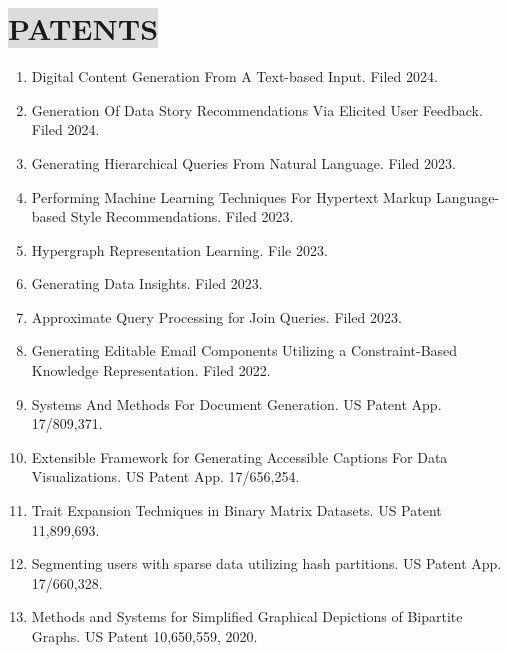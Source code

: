 \section*{
    \colorbox{gainsboro}{PATENTS}  
}

\begin{enumerate}[leftmargin=8mm,nosep]
    \item Digital Content Generation From A Text-based Input. Filed 2024.
    \item Generation Of Data Story Recommendations Via Elicited User Feedback. Filed 2024.
    \item Generating Hierarchical Queries From Natural Language. Filed 2023.
    \item Performing Machine Learning Techniques For Hypertext Markup Language-based Style Recommendations. Filed 2023.
    \item Hypergraph Representation Learning. File 2023.
    \item Generating Data Insights. Filed 2023.
    \item Approximate Query Processing for Join Queries. Filed 2023.
    \item Generating Editable Email Components Utilizing a Constraint-Based Knowledge Representation. Filed 2022.
    \item Systems And Methods For Document Generation. US Patent App. 17/809,371.
    \item Extensible Framework for Generating Accessible Captions For Data Visualizations. US Patent App. 17/656,254.
    \item Trait Expansion Techniques in Binary Matrix Datasets. US Patent 11,899,693.
	\item Segmenting users with sparse data utilizing hash partitions. US Patent App. 17/660,328.
    \item Methods and Systems for Simplified Graphical Depictions of Bipartite Graphs. US Patent 10,650,559, 2020.
\end{enumerate}